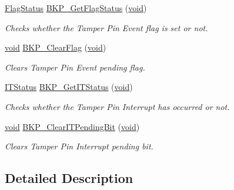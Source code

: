 \begin{DoxyCompactItemize}
\hyperlink{group___exported__types_ga89136caac2e14c55151f527ac02daaff}{Flag\-Status} \hyperlink{group___b_k_p___private___functions_gacc9aedde760383f0bd146f0d77a547db}{B\-K\-P\-\_\-\-Get\-Flag\-Status} (\hyperlink{group___n_a_m_e_ga18028b8badbf1ea7e704ccac3c488e82}{void})
\begin{DoxyCompactList}\small\item\em Checks whether the Tamper Pin Event flag is set or not. \end{DoxyCompactList}\item 
\hyperlink{group___n_a_m_e_ga18028b8badbf1ea7e704ccac3c488e82}{void} \hyperlink{group___b_k_p___private___functions_ga3f3aea5b0a3d8d5d79b0b506928351ea}{B\-K\-P\-\_\-\-Clear\-Flag} (\hyperlink{group___n_a_m_e_ga18028b8badbf1ea7e704ccac3c488e82}{void})
\begin{DoxyCompactList}\small\item\em Clears Tamper Pin Event pending flag. \end{DoxyCompactList}\item 
\hyperlink{group___exported__types_gaacbd7ed539db0aacd973a0f6eca34074}{I\-T\-Status} \hyperlink{group___b_k_p___private___functions_ga99566c9f1f17f499020606cb63511494}{B\-K\-P\-\_\-\-Get\-I\-T\-Status} (\hyperlink{group___n_a_m_e_ga18028b8badbf1ea7e704ccac3c488e82}{void})
\begin{DoxyCompactList}\small\item\em Checks whether the Tamper Pin Interrupt has occurred or not. \end{DoxyCompactList}\item 
\hyperlink{group___n_a_m_e_ga18028b8badbf1ea7e704ccac3c488e82}{void} \hyperlink{group___b_k_p___private___functions_ga6a93ef8e40959bb10fea670e2040ad74}{B\-K\-P\-\_\-\-Clear\-I\-T\-Pending\-Bit} (\hyperlink{group___n_a_m_e_ga18028b8badbf1ea7e704ccac3c488e82}{void})
\begin{DoxyCompactList}\small\item\em Clears Tamper Pin Interrupt pending bit. \end{DoxyCompactList}\end{DoxyCompactItemize}


\subsection{Detailed Description}


